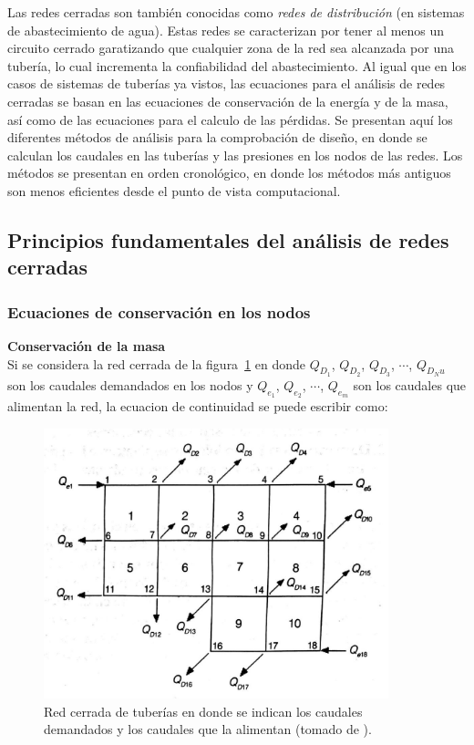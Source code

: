 \documentclass[11pt, oneside]{article}
\begin{document}
Las redes cerradas son tambi\'en conocidas como  \emph{redes de distribuci\'on} (en sistemas de abastecimiento de agua). Estas redes se caracterizan por tener al menos un circuito cerrado garatizando que cualquier zona de la red sea alcanzada por una tuber\'ia, lo cual incrementa la confiabilidad del abastecimiento. Al igual que en los casos de sistemas de tuber\'ias ya vistos, las ecuaciones para el an\'alisis de redes cerradas se basan en las ecuaciones de conservaci\'on de la energ\'ia y de la masa, as\'i como de las ecuaciones para el calculo de las p\'erdidas.
Se presentan aqu\'i los diferentes m\'etodos de an\'alisis para la comprobaci\'on de dise\~no, en donde se calculan los caudales en las tuber\'ias y las presiones en los nodos de las redes. Los m\'etodos se presentan en orden cronol\'ogico, en donde los m\'etodos m\'as antiguos son menos eficientes desde el punto de vista computacional.  

\subsection{Principios fundamentales del an\'alisis de redes cerradas}

\subsubsection*{Ecuaciones de conservaci\'on en los nodos}
\textbf{Conservaci\'on de la masa}\\
Si se considera la red cerrada de la figura~\ref{cpn1} en donde $Q_{D_1}$, $Q_{D_2}$, $Q_{D_3}$, $\cdots$, $Q_{D_Nu}$ son los caudales demandados en los nodos y $Q_{e_1}$,  $Q_{e_2}$, $\cdots$, $Q_{e_m}$ son los caudales que alimentan la red, la ecuacion de continuidad se puede escribir como:

\begin{figure}[h]
\centering
\includegraphics[width=10cm]{./figs/cpn1.jpeg}
\caption{Red cerrada de tuber\'ias en donde se indican los caudales demandados y los caudales que la alimentan (tomado de \cite{saldarriaga}).} 
\label{cpn1}
\end{figure}
\end{document}
